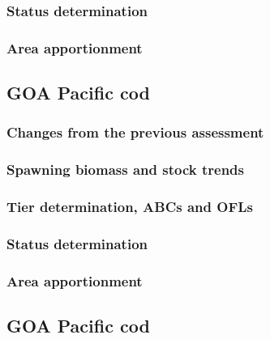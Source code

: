 \documentclass[]{tufte-handout}
\begin{document}
\hypertarget{status-determination-6}{%
\subsubsection{Status determination}\label{status-determination-6}}

\hypertarget{area-apportionment-6}{%
\subsubsection{Area apportionment}\label{area-apportionment-6}}

\hypertarget{goa-pacific-cod-6}{%
\subsection{GOA Pacific cod}\label{goa-pacific-cod-6}}

\hypertarget{changes-from-the-previous-assessment-7}{%
\subsubsection{Changes from the previous
assessment}\label{changes-from-the-previous-assessment-7}}

\hypertarget{spawning-biomass-and-stock-trends-7}{%
\subsubsection{Spawning biomass and stock
trends}\label{spawning-biomass-and-stock-trends-7}}

\hypertarget{tier-determination-abcs-and-ofls-6}{%
\subsubsection{Tier determination, ABCs and
OFLs}\label{tier-determination-abcs-and-ofls-6}}

\hypertarget{status-determination-7}{%
\subsubsection{Status determination}\label{status-determination-7}}

\hypertarget{area-apportionment-7}{%
\subsubsection{Area apportionment}\label{area-apportionment-7}}

\hypertarget{goa-pacific-cod-7}{%
\subsection{GOA Pacific cod}\label{goa-pacific-cod-7}}
\end{document}
